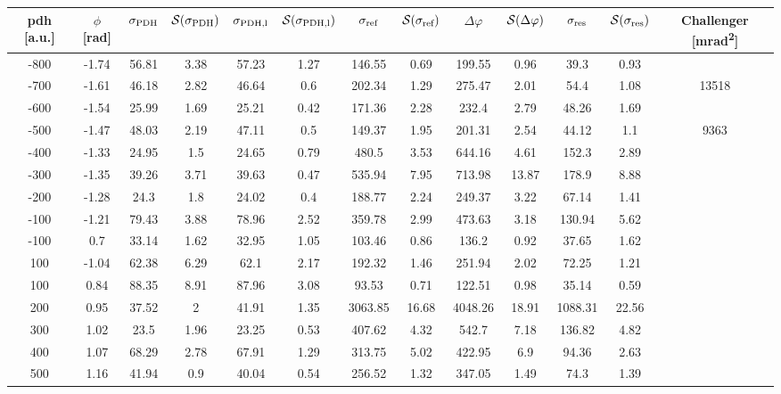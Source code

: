 \begin{landscape}
	
	\begin{table}
	\centering
	\begin{tabular}{|c|c|c|c|c|c|c|c|c|c|c|c|c|}
		\hline
		\gls{pdh} [a.u.] & $\phi$ [\si{\radian}] & $\sigma_{\text{PDH}}$ & $\mathcal{S}(\sigma_{\text{PDH}})$ & $\sigma_{\text{PDH,l}}$ & $\mathcal{S}(\sigma_{\text{PDH,l}})$  & $\sigma_{\text{ref}}$ & $\mathcal{S}(\sigma_{\text{ref}})$ & $\Delta \varphi$ & $\mathcal{S}(\Delta \varphi)$ & $\sigma_{\text{res}}$  & $\mathcal{S}(\sigma_{\text{res}})$ & Challenger [\si{\milli\radian\squared}] \\
		\hline
		\hline
		-800 & -1.74 & 56.81 & 3.38 & 57.23 & 1.27 & 146.55 & 0.69 & 199.55 & 0.96 & 39.3 & 0.93 & \\
		-700 & -1.61 & 46.18 & 2.82 & 46.64 & 0.6 & 202.34 & 1.29 & 275.47 & 2.01 & 54.4 & 1.08 & 13518\\
		-600 & -1.54 & 25.99 & 1.69 & 25.21 & 0.42 & 171.36 & 2.28 & 232.4 & 2.79 & 48.26 & 1.69 & \\
		-500 & -1.47 & 48.03 & 2.19 & 47.11 & 0.5 & 149.37 & 1.95 & 201.31 & 2.54 & 44.12 & 1.1 & 9363\\
		-400 & -1.33 & 24.95 & 1.5 & 24.65 & 0.79 & 480.5 & 3.53 & 644.16 & 4.61 & 152.3 & 2.89 & \\
		-300 & -1.35 & 39.26 & 3.71 & 39.63 & 0.47 & 535.94 & 7.95 & 713.98 & 13.87 & 178.9 & 8.88 & \\
		-200 & -1.28 & 24.3 & 1.8 & 24.02 & 0.4 & 188.77 & 2.24 & 249.37 & 3.22 & 67.14 & 1.41 & \\
		-100 & -1.21 & 79.43 & 3.88 & 78.96 & 2.52 & 359.78 & 2.99 & 473.63 & 3.18 & 130.94 & 5.62 & \\
		-100 & 0.7 & 33.14 & 1.62 & 32.95 & 1.05 & 103.46 & 0.86 & 136.2 & 0.92 & 37.65 & 1.62 & \\
		100 & -1.04 & 62.38 & 6.29 & 62.1 & 2.17 & 192.32 & 1.46 & 251.94 & 2.02 & 72.25 & 1.21 & \\
		100 & 0.84 & 88.35 & 8.91 & 87.96 & 3.08 & 93.53 & 0.71 & 122.51 & 0.98 & 35.14 & 0.59 & \\
		200 & 0.95 & 37.52 & 2 & 41.91 & 1.35 & 3063.85 & 16.68 & 4048.26 & 18.91 & 1088.31 & 22.56 & \\
		300 & 1.02 & 23.5 & 1.96 & 23.25 & 0.53 & 407.62 & 4.32 & 542.7 & 7.18 & 136.82 & 4.82 & \\
		400 & 1.07 & 68.29 & 2.78 & 67.91 & 1.29 & 313.75 & 5.02 & 422.95 & 6.9 & 94.36 & 2.63 & \\
		500 & 1.16 & 41.94 & 0.9 & 40.04 & 0.54 & 256.52 & 1.32 & 347.05 & 1.49 & 74.3 & 1.39 & \\

\end{tabular}
\end{table}
\end{landscape}
